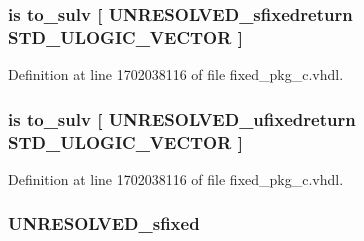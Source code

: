 \subsubsection[{to\+\_\+\+Std\+U\+Logic\+Vector}]{ {\bfseries \textcolor{keywordflow}{is}\textcolor{vhdlchar}{ }\textcolor{vhdlchar}{to\+\_\+sulv}\textcolor{vhdlchar}{ }\textcolor{vhdlchar}{\mbox{[}}\textcolor{vhdlchar}{ }\textcolor{vhdlchar}{U\+N\+R\+E\+S\+O\+L\+V\+E\+D\+\_\+sfixedreturn}\textcolor{vhdlchar}{ }\textcolor{comment}{S\+T\+D\+\_\+\+U\+L\+O\+G\+I\+C\+\_\+\+V\+E\+C\+T\+O\+R}\textcolor{vhdlchar}{ }\textcolor{vhdlchar}{\mbox{]}}\textcolor{vhdlchar}{ }} \hspace{0.3cm}{\ttfamily [Alias]}}\label{classfixed__pkg_a94275a3a9987d9b7662ce161a6fae998}


Definition at line 1702038116 of file fixed\+\_\+pkg\+\_\+c.\+vhdl.

\hypertarget{classfixed__pkg_aa7efe4e1451683feeb97cd0fbca55b5a}{}
\subsubsection[{to\+\_\+\+Std\+U\+Logic\+Vector}]{ {\bfseries \textcolor{keywordflow}{is}\textcolor{vhdlchar}{ }\textcolor{vhdlchar}{to\+\_\+sulv}\textcolor{vhdlchar}{ }\textcolor{vhdlchar}{\mbox{[}}\textcolor{vhdlchar}{ }\textcolor{vhdlchar}{U\+N\+R\+E\+S\+O\+L\+V\+E\+D\+\_\+ufixedreturn}\textcolor{vhdlchar}{ }\textcolor{comment}{S\+T\+D\+\_\+\+U\+L\+O\+G\+I\+C\+\_\+\+V\+E\+C\+T\+O\+R}\textcolor{vhdlchar}{ }\textcolor{vhdlchar}{\mbox{]}}\textcolor{vhdlchar}{ }} \hspace{0.3cm}{\ttfamily [Alias]}}\label{classfixed__pkg_aa7efe4e1451683feeb97cd0fbca55b5a}


Definition at line 1702038116 of file fixed\+\_\+pkg\+\_\+c.\+vhdl.

\hypertarget{classfixed__pkg_a9c2051e860dce0b23561ee440c917fa0}{}
\subsubsection[{U\+\_\+sfixed}]{ {\bfseries {\bfseries {\bf U\+N\+R\+E\+S\+O\+L\+V\+E\+D\+\_\+sfixed}} \textcolor{vhdlchar}{ }} \hspace{0.3cm}{\ttfamily [Subtype]}}\label{classfixed__pkg_a9c2051e860dce0b23561ee440c917fa0}


